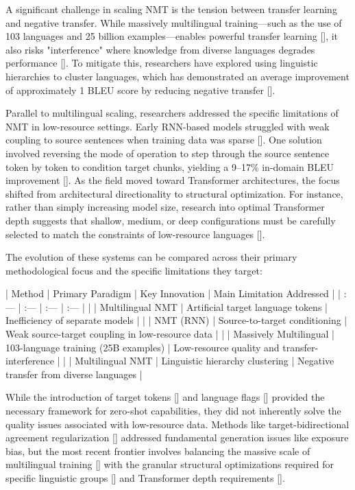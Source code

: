 \documentclass[11pt]{article}
\begin{document}
A significant challenge in scaling NMT is the tension between transfer learning and negative transfer. While massively multilingual training—such as the use of 103 languages and 25 billion examples—enables powerful transfer learning [\citep{1907.05019}], it also risks "interference" where knowledge from diverse languages degrades performance [\citep{1907.05019}]. To mitigate this, researchers have explored using linguistic hierarchies to cluster languages, which has demonstrated an average improvement of approximately 1 BLEU score by reducing negative transfer [\citep{2110.07816}].

Parallel to multilingual scaling, researchers addressed the specific limitations of NMT in low-resource settings. Early RNN-based models struggled with weak coupling to source sentences when training data was sparse [\citep{1708.05729}]. One solution involved reversing the mode of operation to step through the source sentence token by token to condition target chunks, yielding a 9–17\% in-domain BLEU improvement [\citep{1708.05729}]. As the field moved toward Transformer architectures, the focus shifted from architectural directionality to structural optimization. For instance, rather than simply increasing model size, research into optimal Transformer depth suggests that shallow, medium, or deep configurations must be carefully selected to match the constraints of low-resource languages [\citep{2004.04418}].

The evolution of these systems can be compared across their primary methodological focus and the specific limitations they target:

| Method | Primary Paradigm | Key Innovation | Main Limitation Addressed |
| :--- | :--- | :--- | :--- |
| \citep{1611.04558} | Multilingual NMT | Artificial target language tokens | Inefficiency of separate models |
| \citep{1708.05729} | NMT (RNN) | Source-to-target conditioning | Weak source-target coupling in low-resource data |
| \citep{1907.05019} | Massively Multilingual | 103-language training (25B examples) | Low-resource quality and transfer-interference |
| \citep{2110.07816} | Multilingual NMT | Linguistic hierarchy clustering | Negative transfer from diverse languages |

While the introduction of target tokens [\citep{1611.04558}] and language flags [\citep{1909.07342}] provided the necessary framework for zero-shot capabilities, they did not inherently solve the quality issues associated with low-resource data. Methods like target-bidirectional agreement regularization [\citep{1808.04064}] addressed fundamental generation issues like exposure bias, but the most recent frontier involves balancing the massive scale of multilingual training [\citep{1907.05019}] with the granular structural optimizations required for specific linguistic groups [\citep{2110.07816}] and Transformer depth requirements [\citep{2004.04418}].
\end{document}
